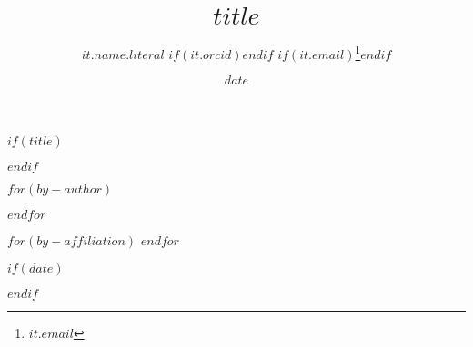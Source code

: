 $if(title)$
\title{$title$}
$endif$

$for(by-author)$
  \author[$for(it.affiliations)$$it.id$$sep$,$endfor$]{
    $it.name.literal$%
    $if(it.orcid)$$endif$%
    $if(it.email)$\thanks{\href{mailto:$it.email$}{$it.email$}}$endif$%
  }
$endfor$

$for(by-affiliation)$
$endfor$

$if(date)$
  \date{$date$}
$endif$
